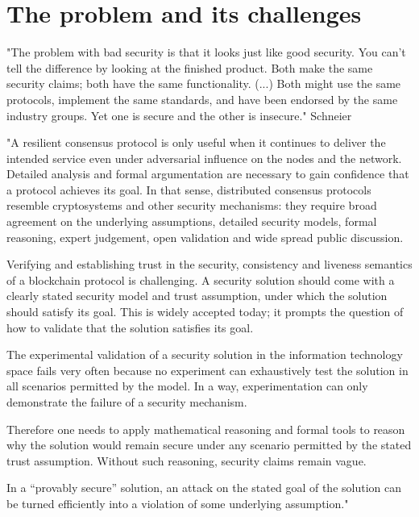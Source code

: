 \chapter{The problem and its challenges}

"The problem with bad security is that it looks just like good security. You can’t tell the difference by looking at the finished product. Both make the same security claims; both have the same functionality. (...) Both might use the same protocols, implement the same standards, and have been endorsed by the same industry groups. Yet one is secure and the other is insecure." Schneier


"A resilient consensus protocol is only useful when it continues to deliver the intended service even under adversarial influence on the nodes and the network. Detailed analysis and formal argumentation are necessary to gain confidence that a protocol achieves its goal. In that sense, distributed consensus protocols resemble cryptosystems and other security mechanisms: they require broad agreement on the underlying assumptions, detailed security models, formal reasoning, expert judgement, open validation and wide spread public discussion. 

Verifying and establishing trust in the security, consistency and liveness semantics of a blockchain protocol is challenging.
A security solution should come with a clearly stated security model and trust assumption, under which the solution should satisfy its goal. This is widely accepted today; it prompts the question of how to validate that the solution satisfies its goal.

The experimental validation of a security solution in the information technology space fails very often because no experiment can exhaustively test the solution in all scenarios permitted by the model. In a way, experimentation can only demonstrate the failure of a security mechanism.

Therefore one needs to apply mathematical reasoning and formal tools to reason why the solution would remain secure under any scenario permitted by the stated trust assumption. Without such reasoning, security claims remain vague.

In a “provably secure” solution, an attack on the stated goal of the solution can be turned efficiently into a violation of some underlying assumption."
\citep{wild}








